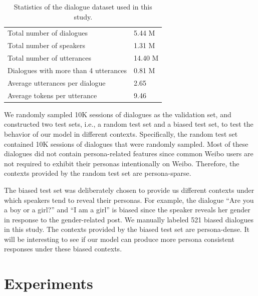 \documentclass[letterpaper]{article}
\begin{document}
\begin{table}[tb]
\centering
\caption{Statistics of the dialogue dataset used in this study.}
 \begin{tabular}{ll}
  \toprule
  Total number of dialogues             & 5.44 M  \\
  Total number of speakers              & 1.31 M  \\
  Total number of utterances            & 14.40 M \\
  Dialogues with more than 4 utterances & 0.81 M  \\
  Average utterances per dialogue       & 2.65    \\
  Average tokens per utterance          & 9.46    \\
  \bottomrule
 \end{tabular}
\label{tab:dataset}
\end{table}

We randomly sampled 10K sessions of dialogues as the validation set, and constructed two test sets, i.e., a random test set and a biased test set, to test the behavior of our model in different contexts. Specifically, the random test set contained 10K sessions of dialogues that were randomly sampled. Most of these dialogues did not contain persona-related features since common Weibo users are not required to exhibit their personas intentionally on Weibo. Therefore, the contexts provided by the random test set are persona-sparse.

The biased test set was deliberately chosen to provide us different contexts under which speakers tend to reveal their personas. For example, the dialogue ``Are you a boy or a girl?'' and ``I am a girl'' is biased since the speaker reveals her gender in response to the gender-related post. We manually labeled 521 biased dialogues in this study. The contexts provided by the biased test set are persona-dense. It will be interesting to see if our model can produce more persona consistent responses under these biased contexts.

\section{Experiments}\label{sec:exp}
\end{document}
